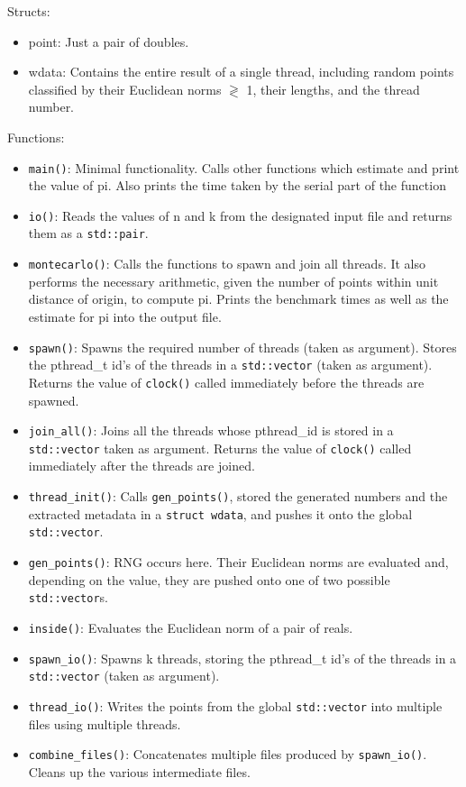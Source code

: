 \documentclass{amsart}           %
\begin{document}
    Structs: 
    \begin{itemize}
        \item point: Just a pair of doubles. 
        \item wdata: Contains the entire result of a single thread, including random points classified by their Euclidean norms $\gtrless$ 1, their lengths, and the thread number.
    \end{itemize}
    Functions:
    \begin{itemize}
        \item \texttt{main()}: Minimal functionality. Calls other functions which estimate and print the value of pi. Also prints the time taken by the serial part of the function
        \item \texttt{io()}: Reads the values of n and k from the designated input file and returns them as a \texttt{std::pair}.
        \item \texttt{montecarlo()}: Calls the functions to spawn and join all threads. It also performs the necessary arithmetic, given the number of points within unit distance of origin, to compute pi. Prints the benchmark times as well as the estimate for pi into the output file.
        \item \texttt{spawn()}: Spawns the required number of threads (taken as argument). Stores the pthread\_t id's of the threads in a \texttt{std::vector} (taken as argument). Returns the value of \texttt{clock()} called immediately before the threads are spawned.
        \item \texttt{join\_all()}: Joins all the threads whose pthread\_id is stored in a \texttt{std::vector} taken as argument. Returns the value of \texttt{clock()} called immediately after the threads are joined.
        \item \texttt{thread\_init()}: Calls \texttt{gen\_points()}, stored the generated numbers and the extracted metadata in a \texttt{struct wdata}, and pushes it onto the global \texttt{std::vector}.
        \item \texttt{gen\_points()}: RNG occurs here. Their Euclidean norms are evaluated and, depending on the value, they are pushed onto one of two possible \texttt{std::vector}s. 
        \item \texttt{inside()}: Evaluates the Euclidean norm of a pair of reals.
        \item \texttt{spawn\_io()}: Spawns k threads, storing the pthread\_t id's of the threads in a \texttt{std::vector} (taken as argument). 
        \item \texttt{thread\_io()}: Writes the points from the global \texttt{std::vector} into multiple files using multiple threads.
        \item \texttt{combine\_files()}: Concatenates multiple files produced by \texttt{spawn\_io()}. Cleans up the various intermediate files.
    \end{itemize}
        
\end{document}
